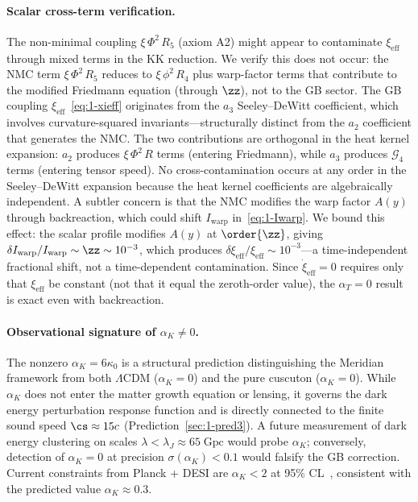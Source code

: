 \paragraph{Scalar cross-term verification.} The non-minimal coupling $\xi\,\Phi^2\,R_5$ (axiom A2) might appear to contaminate $\xi_{\mathrm{eff}}$ through mixed terms in the KK reduction. We verify this does not occur: the NMC term $\xi\,\Phi^2\,R_5$ reduces to $\xi\,\phi^2\,R_4$ plus warp-factor terms that contribute to the modified Friedmann equation (through $\zz$), not to the GB sector. The GB coupling $\xi_{\mathrm{eff}}$~\eqref{eq:1-xieff} originates from the $a_3$ Seeley--DeWitt coefficient, which involves curvature-squared invariants---structurally distinct from the $a_2$ coefficient that generates the NMC. The two contributions are orthogonal in the heat kernel expansion: $a_2$ produces $\xi\,\Phi^2\,R$ terms (entering Friedmann), while $a_3$ produces $\mathcal{G}_4$ terms (entering tensor speed). No cross-contamination occurs at any order in the Seeley--DeWitt expansion because the heat kernel coefficients are algebraically independent. A subtler concern is that the NMC modifies the warp factor $A(y)$ through backreaction, which could shift $I_{\mathrm{warp}}$ in~\eqref{eq:1-Iwarp}. We bound this effect: the scalar profile modifies $A(y)$ at $\order{\zz}$, giving $\delta I_{\mathrm{warp}}/I_{\mathrm{warp}} \sim \zz \sim 10^{-3}$, which produces $\delta\xi_{\mathrm{eff}}/\xi_{\mathrm{eff}} \sim 10^{-3}$---a time-independent fractional shift, not a time-dependent contamination. Since $\dot{\xi}_{\mathrm{eff}} = 0$ requires only that $\xi_{\mathrm{eff}}$ be constant (not that it equal the zeroth-order value), the $\alpha_T = 0$ result is exact even with backreaction.

\paragraph{Observational signature of $\alpha_K \neq 0$.} The nonzero $\alpha_K = 6\kappa_0$ is a structural prediction distinguishing the Meridian framework from both $\Lambda$CDM ($\alpha_K = 0$) and the pure cuscuton ($\alpha_K = 0$). While $\alpha_K$ does not enter the matter growth equation or lensing, it governs the dark energy perturbation response function and is directly connected to the finite sound speed $\cs \approx 15c$ (Prediction~\ref{sec:1-pred3}). A future measurement of dark energy clustering on scales $\lambda < \lambda_J \approx 65\;\mathrm{Gpc}$ would probe $\alpha_K$; conversely, detection of $\alpha_K = 0$ at precision $\sigma(\alpha_K) < 0.1$ would falsify the GB correction. Current constraints from Planck + DESI are $\alpha_K < 2$ at 95\% CL~\cite{ch1:bellini-sawicki}, consistent with the predicted value $\alpha_K \approx 0.3$.

